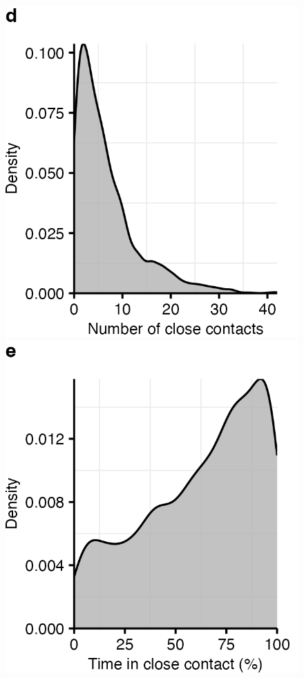 \documentclass[fleqn,11pt]{wlscirep}
\begin{document}
\begin{figure}
    \includegraphics{results/data/number-close-contacts.png}
    \includegraphics{results/data/time-close-contacts.png}

\end{figure}
\end{document}
